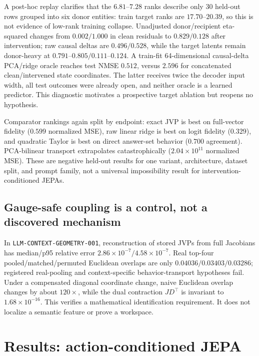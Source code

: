 \documentclass[10pt]{article}
\newcommand{\code}[1]{\texttt{#1}}
\begin{document}
A post-hoc replay clarifies that the $6.81$--$7.28$ ranks describe only 30
held-out rows grouped into six donor entities: train target ranks are
$17.70$--$20.39$, so this is not evidence of low-rank training collapse.
Unadjusted donor/recipient eta-squared changes from $0.002/1.000$ in clean
residuals to $0.829/0.128$ after intervention; raw causal deltas are
$0.496/0.528$, while the target latents remain donor-heavy at
$0.791$--$0.805/0.111$--$0.124$. A train-fit 64-dimensional causal-delta
PCA/ridge oracle reaches test NMSE $0.512$, versus $2.596$ for concatenated
clean/intervened state coordinates. The latter receives twice the decoder
input width, all test outcomes were already open, and neither oracle is a
learned predictor. This diagnostic motivates a prospective target ablation but
reopens no hypothesis.

Comparator rankings again split by endpoint: exact JVP is best on full-vector
fidelity ($0.599$ normalized MSE), raw linear ridge is best on logit fidelity
($0.329$), and quadratic Taylor is best on direct answer-set behavior ($0.700$
agreement).  PCA-bilinear transport extrapolates catastrophically
($2.04\times10^{11}$ normalized MSE).  These are negative held-out results
for one variant, architecture, dataset split, and prompt family, not a universal impossibility
result for intervention-conditioned JEPAs.

\subsection{Gauge-safe coupling is a control, not a discovered mechanism}

In \code{LLM-CONTEXT-GEOMETRY-001}, reconstruction of stored JVPs from full
Jacobians has median/p95 relative error
$2.86\times10^{-7}/4.58\times10^{-7}$.  Real top-four
pooled/matched/permuted Euclidean overlaps are only
$0.04036/0.03403/0.03286$; registered real-pooling and context-specific
behavior-transport hypotheses fail.  Under a compensated diagonal coordinate
change, naive Euclidean overlap changes by about $120\times$, while the dual
contraction $JD^\top$ is invariant to $1.68\times10^{-16}$.  This verifies a
mathematical identification requirement.  It does not localize a semantic
feature or prove a workspace.

\section{Results: action-conditioned JEPA}
\end{document}
